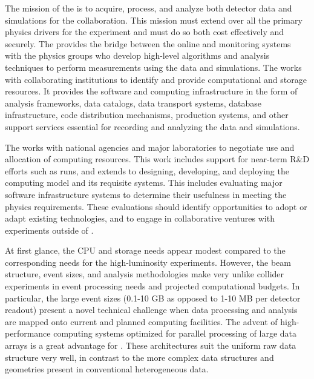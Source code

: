 The mission of the  %
 is to acquire, process, and analyze both detector data and  simulations for the %
collaboration.  This mission must extend over all the primary physics drivers for the experiment and must do so both cost effectively and securely. The  provides the bridge between the online  and monitoring systems with the physics groups who develop high-level algorithms and analysis techniques to perform measurements using the   data and simulations. The  works with collaborating institutions to identify and provide computational and storage resources.  %
It provides the software and computing infrastructure in the form of analysis frameworks, data catalogs, data transport systems, database infrastructure, code distribution mechanisms, production systems, and other support services essential for recording and analyzing the data and simulations. 

The  works with national agencies and major laboratories to negotiate use and allocation of computing resources.  This work includes support for near-term R\&D efforts %
such as  runs, and extends to designing, developing, and deploying the  computing model and its requisite systems. 
This includes evaluating major software infrastructure systems to determine their usefulness %
in meeting the  physics requirements.  These evaluations should identify opportunities to adopt or adapt existing technologies, and to engage in collaborative ventures with  experiments outside of . 


At first glance,  the  CPU and storage needs %
appear modest %
compared to the corresponding needs for the high-luminosity  experiments.  
However, the  beam structure, event sizes, and analysis methodologies make  very unlike collider experiments %
in event processing needs and projected computational budgets. 
In particular, the large  event sizes (0.1-10 GB as opposed to 1-10 MB per detector readout) present a novel technical challenge when data processing and analysis are mapped onto  current and planned computing facilities. 
The advent of high-performance computing systems optimized for parallel processing of large data arrays is a great advantage for . These architectures suit the uniform   raw data structure very well, in contrast to the more complex data structures and geometries present in conventional %
heterogeneous  data. 


